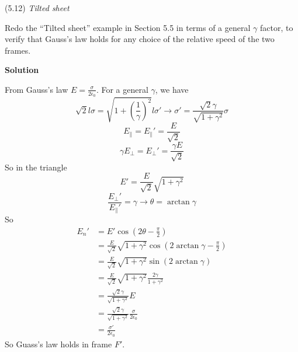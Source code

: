 \documentclass{article}
\begin{document}
\begin{homeworkProblem}
	(5.12) \textit{Tilted sheet}

	Redo the ``Tilted sheet'' example in Section 5.5 in terms of a general $\gamma$ factor, to verify that Gauss's law holds for any choice of the relative speed of the two frames.

	\textbf{Solution}

	From Gauss's law $E=\frac{\sigma}{2\epsilon_0}$. For a general $\gamma$, we have
	\[
		\sqrt{2}l \sigma=\sqrt{1+\left(\frac{1}{\gamma}\right)^2}l\sigma'\longrightarrow\sigma'=\frac{\sqrt{2}\gamma}{\sqrt{1+\gamma^2}}\sigma
	\]
	\[
		E_\parallel={E_\parallel}'=\frac{E}{\sqrt{2}}
	\]
	\[
		\gamma E_\perp={E_\perp}'=\frac{\gamma E}{\sqrt{2}}
	\]
	So in the triangle
	\[
		E'=\frac{E}{\sqrt{2}}\sqrt{1+\gamma^2}
	\]
	\[
		\frac{{E_\perp}'}{{E_\parallel}'}=\gamma\longrightarrow\theta=\arctan\gamma
	\]
	So
	\begin{align*}
		{E_n}'&=E'\cos\left(2\theta-\frac{\pi}{2}\right) \\
		&=\frac{E}{\sqrt{2}}\sqrt{1+\gamma^2}\cos\left(2\arctan\gamma-\frac{\pi}{2}\right) \\
		&=\frac{E}{\sqrt{2}}\sqrt{1+\gamma^2}\sin\left(2\arctan\gamma\right) \\
		&=\frac{E}{\sqrt{2}}\sqrt{1+\gamma^2}\frac{2\gamma}{1+\gamma^2} \\
		&=\frac{\sqrt{2}\gamma}{\sqrt{1+\gamma^2}}E \\
		&=\frac{\sqrt{2}\gamma}{\sqrt{1+\gamma^2}}\frac{\sigma}{2\epsilon_0} \\
		&=\frac{\sigma'}{2\epsilon_0}
	\end{align*}
	So Guass's law holds in frame $F'$.
\end{homeworkProblem}

\end{document}
